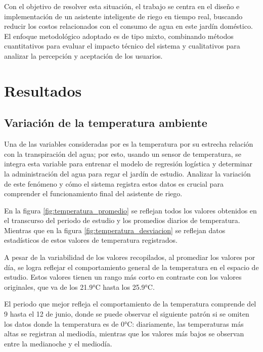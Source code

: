\documentclass[pdflatex,sn-mathphys-num]{sn-jnl}%
\theoremstyle{thmstyleone}%
\theoremstyle{thmstyletwo}%
\theoremstyle{thmstylethree}%
\begin{document}
\begin{multicols}{2}
Con el objetivo de resolver esta situación, el trabajo se centra en el diseño e implementación de un asistente inteligente de riego en tiempo real, buscando reducir los costos relacionados con el consumo de agua en este jardín doméstico. El enfoque metodológico adoptado es de tipo mixto, combinando métodos cuantitativos para evaluar el impacto técnico del sistema y cualitativos para analizar la percepción y aceptación de los usuarios.
\section*{Resultados}\label{sec2}
\subsection*{Variación de la temperatura ambiente}
Una de las variables consideradas por \cite{ref12} es la temperatura por su estrecha relación con la transpiración del agua; por esto, usando un sensor de temperatura, se integra esta variable para entrenar el modelo de regresión logística y determinar la administración del agua para regar el jardín de estudio. Analizar la variación de este fenómeno y cómo el sistema registra estos datos es crucial para comprender el funcionamiento final del asistente de riego.

En la figura \ref{fig:temperatura_promedio} se reflejan todos los valores obtenidos en el transcurso del periodo de estudio y los promedios diarios de temperatura. Mientras que en la figura \ref{fig:temperatura_desviacion} se reflejan datos estadísticos de estos valores de temperatura registrados. 

A pesar de la variabilidad de los valores recopilados, al promediar los valores por día, se logra reflejar el comportamiento general de la temperatura en el espacio de estudio. Estos valores tienen un rango más corto en contraste con los valores originales, que va de los 21.9°C hasta los 25.9°C.

El periodo que mejor refleja el comportamiento de la temperatura comprende del 9 hasta el 12 de junio, donde se puede observar el siguiente patrón si se omiten los datos donde la temperatura es de 0°C: diariamente, las temperaturas más altas se registran al mediodía, mientras que los valores más bajos se observan entre la medianoche y el mediodía.
    
\end{multicols}
\end{document}
